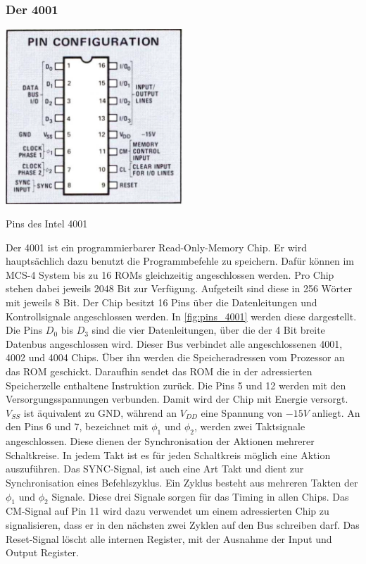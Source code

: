 \subsubsection{Der 4001}
 \begin{floatingfigure}[r]{.5\textwidth}
 	\vspace{-10pt}
 	\includegraphics[width=0.5\textwidth]{figures/pins_4001.png}
 	\caption{Pins des Intel 4001}
 	\label{fig:pins_4001}
 \end{floatingfigure}
 Der 4001 ist ein programmierbarer Read-Only-Memory Chip. Er wird hauptsächlich dazu benutzt die Programmbefehle zu speichern. Dafür können im MCS-4 System bis zu 16 ROMs gleichzeitig angeschlossen werden. Pro Chip stehen dabei jeweils 2048 Bit zur Verfügung. Aufgeteilt sind diese in 256 Wörter mit jeweils 8 Bit. Der Chip besitzt 16 Pins über die Datenleitungen und Kontrollsignale angeschlossen werden. In \ref{fig:pins_4001} werden diese dargestellt. Die Pins $D_0$ bis $D_3$ sind die vier Datenleitungen, über die der 4 Bit breite Datenbus angeschlossen wird. Dieser Bus verbindet alle angeschlossenen 4001, 4002 und 4004 Chips. Über ihn werden die Speicheradressen vom Prozessor an das ROM geschickt. Daraufhin sendet das ROM die in der adressierten Speicherzelle enthaltene Instruktion zurück. Die Pins 5 und 12 werden mit den Versorgungsspannungen verbunden. Damit wird der Chip mit Energie versorgt. $V_{SS}$ ist äquivalent zu GND, während an $V_{DD}$ eine Spannung von $-15V$ anliegt.
 An den Pins 6 und 7, bezeichnet mit $\phi_1$ und $\phi_2$, werden zwei Taktsignale angeschlossen. Diese dienen der Synchronisation der Aktionen mehrerer Schaltkreise. In jedem Takt ist es für jeden Schaltkreis möglich eine Aktion auszuführen. Das SYNC-Signal, ist auch eine Art Takt und dient zur Synchronisation eines Befehlszyklus. Ein Zyklus besteht aus mehreren Takten der $\phi_1$ und $\phi_2$ Signale. Diese drei Signale sorgen für das Timing in allen Chips. Das CM-Signal auf Pin 11 wird dazu verwendet um einem adressierten Chip zu signalisieren, dass er in den nächsten zwei Zyklen auf den Bus schreiben darf. Das Reset-Signal löscht alle internen Register, mit der Ausnahme der Input und Output Register.
